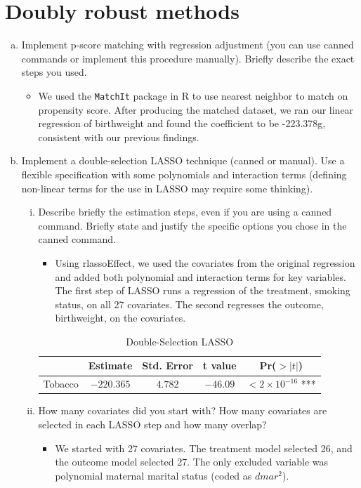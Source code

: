 \documentclass{article}
\begin{document}
\section{Doubly robust methods}
\begin{enumerate}[(a)]
    \item Implement p-score matching with regression adjustment (you can use canned commands or implement this procedure manually). Briefly describe the exact steps you used.
    \begin{itemize}
        \item We used the \verb|MatchIt| package in R to use nearest neighbor to match on propensity score. After producing the matched dataset, we ran our linear regression of birthweight and found the coefficient to be -223.378g, consistent with our previous findings.
    \end{itemize}
    \item Implement a double-selection LASSO technique (canned or manual). Use a flexible specification with some polynomials and interaction terms (defining non-linear terms for the use in LASSO may require some thinking).
    \begin{enumerate}[i.]
        \item Describe briefly the estimation steps, even if you are using a canned command. Briefly state and justify the specific options you chose in the canned command.
        \begin{itemize}
            \item Using rlassoEffect, we used the covariates from the original regression and added both polynomial and interaction terms for key variables. The first step of LASSO runs a regression of the treatment, smoking status, on all 27 covariates. The second regresses the outcome, birthweight, on the covariates.            
        \end{itemize}
        \begin{table}[h]
            \centering
            \caption{Double-Selection LASSO}
            \begin{tabular}{lcccc}
            \hline
            \hline
            & Estimate & Std. Error & t value & Pr($>|t|$) \\
            \hline
            Tobacco & $-220.365$ & $4.782$ & $-46.09$ & $<2\times 10^{-16}$ *** \\
            \hline
            \hline
            \end{tabular}
        \end{table}
        \item How many covariates did you start with? How many covariates are selected in each LASSO step and how many overlap?
        \begin{itemize}
            \item We started with 27 covariates. The treatment model selected 26, and the outcome model selected 27. The only excluded variable was polynomial maternal marital status (coded as $dmar^2$).
        \end{itemize}
    \end{enumerate}
\end{enumerate}
\end{document}
